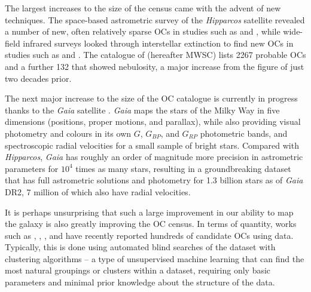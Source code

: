 The largest increases to the size of the census came with the advent of new techniques. The space-based astrometric survey of the \emph{Hipparcos} satellite \citep{hog_tycho-2_2000} revealed a number of new, often relatively sparse OCs in studies such as \cite{platais_search_1998} and \cite{chereul_distribution_1999}, while wide-field infrared surveys looked through interstellar extinction to find new OCs in studies such as \cite{dutra_new_2001} and \cite{froebrich_systematic_2007}. The catalogue of \cite{kharchenko_global_2013} (hereafter MWSC) lists 2267 probable OCs and a further 132 that showed nebulosity, a major increase from the figure of \cite{mermilliod_database_1995} just two decades prior.

The next major increase to the size of the OC catalogue is currently in progress thanks to the \emph{Gaia} satellite \citep{brown_gaia_2018}. \emph{Gaia} maps the stars of the Milky Way in five dimensions (positions, proper motions, and parallax), while also providing visual photometry and colours in its own $G$, $G_{BP}$, and $G_{RP}$ photometric bands, and spectroscopic radial velocities for a small sample of bright stars. Compared with \emph{Hipparcos}, \emph{Gaia} has roughly an order of magnitude more precision in astrometric parameters for $10^4$ times as many stars, resulting in a groundbreaking dataset that has full astrometric solutions and photometry for 1.3 billion stars as of \emph{Gaia} DR2, 7 million of which also have radial velocities.

It is perhaps unsurprising that such a large improvement in our ability to map the galaxy is also greatly improving the OC census. In terms of quantity, works such as \cite{castro-ginard_new_2018,castro-ginard_hunting_2019,castro-ginard_hunting_2020}, \cite{liu_catalog_2019}, \cite{sim_207_2019}, and \cite{cantat-gaudin_gaia_2019} have recently reported hundreds of candidate OCs using \emph{} data. Typically, this is done using automated blind searches of the \emph{} dataset with clustering algorithms -- a type of unsupervised machine learning that can find the most natural groupings or clusters within a dataset, requiring only basic parameters and minimal prior knowledge about the structure of the data.

